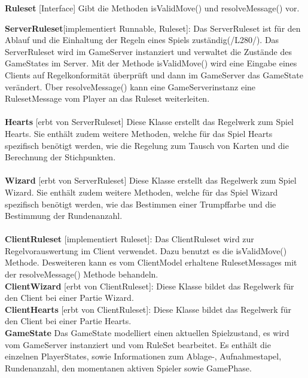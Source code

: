\documentclass{article}
\begin{document}
\textbf{Ruleset} [Interface] Gibt die Methoden isValidMove() und resolveMessage() vor.

\textbf{ServerRuleset}[implementiert Runnable, Ruleset]: Das ServerRuleset  ist für den Ablauf und die Einhaltung der Regeln eines Spiels zuständig(/L280/). Das ServerRuleset wird im GameServer instanziert und verwaltet die Zustände des GameStates im Server. Mit der Methode isValidMove() wird eine Eingabe eines Clients auf Regelkonformität überprüft und dann im GameServer  das GameState verändert. Über resolveMessage() kann eine GameServerinstanz eine RulesetMessage vom Player an das Ruleset weiterleiten. \\ \\
		
\textbf{Hearts} [erbt von ServerRuleset]  Diese Klasse erstellt das Regelwerk zum Spiel Hearts. Sie enthält zudem weitere Methoden, welche für das Spiel Hearts spezifisch benötigt werden, wie die Regelung zum Tausch von Karten und die Berechnung der Stichpunkten. \\ \\
		
\textbf{Wizard} [erbt von ServerRuleset] Diese Klasse erstellt das Regelwerk zum Spiel Wizard. Sie enthält zudem weitere Methoden, welche für das Spiel Wizard spezifisch benötigt werden, wie das Bestimmen einer Trumpffarbe und die Bestimmung der Rundenanzahl. \\ \\
		
\textbf{ClientRuleset} [implementiert Ruleset]:  Das ClientRuleset wird zur Regelvorauswertung im Client verwendet. Dazu benutzt es die isValidMove() Methode. Desweiteren kann es vom ClientModel erhaltene RulesetMessages mit der resolveMessage() Methode behandeln.  \\

\textbf{ClientWizard} [erbt von ClientRuleset]: Diese Klasse bildet das Regelwerk für den Client bei einer Partie Wizard. \\

\textbf{ClientHearts} [erbt von ClientRuleset]: Diese Klasse bildet das Regelwerk für den Client bei einer Partie Hearts. \\
		
\textbf{GameState} Das GameState modelliert einen aktuellen Spielzustand, es wird vom GameServer instanziert und vom RuleSet bearbeitet. Es enthält die einzelnen PlayerStates, sowie Informationen zum Ablage-, Aufnahmestapel, Rundenanzahl, den momentanen aktiven Spieler sowie GamePhase. \\ \\
		
\end{document}
